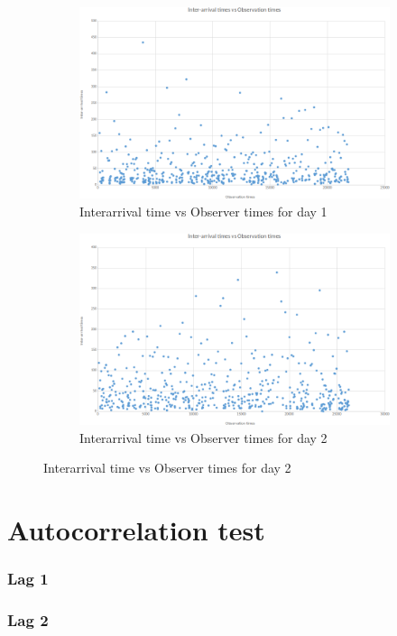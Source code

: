 \documentclass{article}
\begin{document}
\begin{figure}[H]
    \begin{subfigure}{0.5\textwidth}
        \includegraphics[width=\linewidth]{day1-interarrival-timeseries.png}
        \caption{Interarrival time vs Observer times for day 1}
    \end{subfigure}
    \begin{subfigure}{0.5\textwidth}
        \includegraphics[width=\linewidth]{day2-interarrival-timeseries.png}
        \caption{Interarrival time vs Observer times for day 2}
    \end{subfigure}
\end{figure}

\section{Autocorrelation test}

\subsubsection{Lag 1}

\subsubsection{Lag 2}

\end{document}
